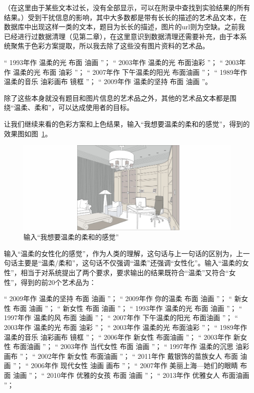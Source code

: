 \normalsize
（在这里由于某些文本过长，没有全部显示，可以在附录中查找到实验结果的所有结果。）受到干扰信息的影响，其中大多数都是带有长长的描述的艺术品文本，在数据库中出现这样一类的文本，题目为长长的描述，图片的url则为空缺。之前我已经进行过数据清理（见第二章），在这里意识到数据清理还需要补充，由于本系统聚焦于色彩方案提取，所以我去除了这些没有图片资料的艺术品。

\footnotesize
“ 1993年作 温柔的光 布面 油画 ”；
“ 2003年作 温柔的光 布面油彩 ”；
“ 2003年作 温柔的光 布面 油彩 ”；
“ 2007年作 下午温柔的阳光 布面油画 ”；
“ 1989年作 温柔的音乐 油彩画布 镜框 ”；
“ 2009年作 温柔的坚持 布面 油画 ”。

\normalsize
除了这些本身就没有题目和图片信息的艺术品之外，其他的艺术品文本都是围绕“温柔、柔和”，可以达成使用者的目标。




让我们继续来看的色彩方案和上色结果，输入“我想要温柔的柔和的感觉”，得到的效果图如图~\ref{figure:温柔}。

\begin{figure}[!htbp]
\centering
\includegraphics[width=\linewidth,keepaspectratio]{data/chapter-4/温柔.jpg}
\caption{输入“我想要温柔的柔和的感觉”}
\label{figure:温柔}
\end{figure}

输入“温柔的女性化的感觉”，作为人类的理解，这句话与上一句话的区别为，上一句话主要是“温柔/柔和”，这句话不仅强调“温柔”还强调“女性化”。输入“温柔的女性”，相当于对系统提出了两个要求，要求输出的结果既符合“温柔”又符合“女性”，得到的前20个艺术品为：

\footnotesize
“ 2009年作 温柔的坚持 布面 油画 ”；
“ 2009年作 你的温柔 布面 油画 ”；
“ 新女性 布面 油画 ”；
“ 新女性 布面 油画 ”；
“ 1993年作 温柔的光 布面 油画 ”；
“ 1997年作 温柔的风 布面 油画 ”；
“ 2007年作 下午温柔的阳光 布面油画 ”；
“ 2003年作 温柔的光 布面 油彩 ”；
“ 2003年作 温柔的光 布面油彩 ”；
“ 1989年作 温柔的音乐 油彩画布 镜框 ”；
“ 2006年作 新女性 布面油画 ”；
“ 2003年作 新女性 布面油画 ”；
“ 2003年作 当代女性 布面 油画 ”；
“ 1997年作 温柔的沉思 油彩 画布 ”；
“ 2002年作 新女性 布面油画 ”；
“ 2011年作 戴银饰的苗族女人 布面 油画 ”；
“ 2006年作 现代女性 油画 画布 ”；
“ 2007年作 美丽上海—她们的眼睛 布面 油画 ”；
“ 2010年作 优雅的女孩 布面 油画 ”；
“ 2013年作 优雅女人 布面油画 ”；

